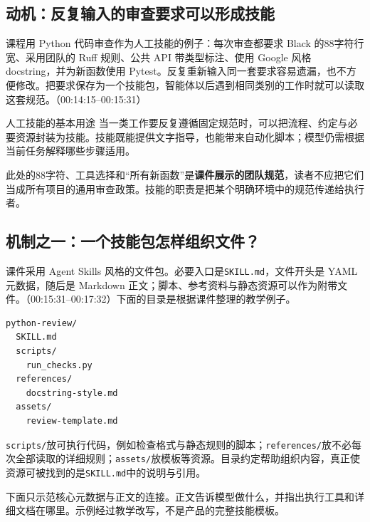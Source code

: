 \documentclass[11pt,a4paper]{article}
\begin{document}
\subsection{动机：反复输入的审查要求可以形成技能}

课程用 Python 代码审查作为人工技能的例子：每次审查都要求 Black 的88字符行宽、采用团队的 Ruff 规则、公共 API 带类型标注、使用 Google 风格 docstring，并为新函数使用 Pytest。反复重新输入同一套要求容易遗漏，也不方便修改。把要求保存为一个技能包，智能体以后遇到相同类别的工作时就可以读取这套规范。（00:14:15--00:15:31）

\begin{importantbox}{人工技能的基本用途}
当一类工作要反复遵循固定规范时，可以把流程、约定与必要资源封装为技能。技能既能提供文字指导，也能带来自动化脚本；模型仍需根据当前任务解释哪些步骤适用。
\end{importantbox}

此处的88字符、工具选择和“所有新函数”是\textbf{课件展示的团队规范}，读者不应把它们当成所有项目的通用审查政策。技能的职责是把某个明确环境中的规范传递给执行者。

\subsection{机制之一：一个技能包怎样组织文件？}

课件采用 Agent Skills 风格的文件包。必要入口是\texttt{SKILL.md}，文件开头是 YAML 元数据，随后是 Markdown 正文；脚本、参考资料与静态资源可以作为附带文件。（00:15:31--00:17:32）下面的目录是根据课件整理的教学例子。

\par\noindent\begin{minipage}{\linewidth}
\begin{lstlisting}[language={},caption={教学例子：Python审查技能的文件组织}]
python-review/
  SKILL.md
  scripts/
    run_checks.py
  references/
    docstring-style.md
  assets/
    review-template.md
\end{lstlisting}
\end{minipage}

\texttt{scripts/}放可执行代码，例如检查格式与静态规则的脚本；\texttt{references/}放不必每次全部读取的详细规则；\texttt{assets/}放模板等资源。目录约定帮助组织内容，真正使资源可被找到的是\texttt{SKILL.md}中的说明与引用。

下面只示范核心元数据与正文的连接。正文告诉模型做什么，并指出执行工具和详细文档在哪里。示例经过教学改写，不是产品的完整技能模板。
\end{document}
